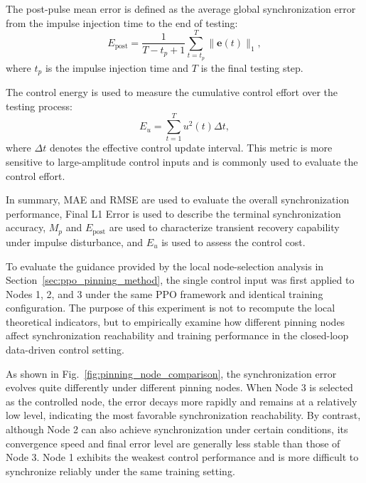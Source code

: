 \documentclass[10pt,twocolumn]{article}
\theoremstyle{definition}
\begin{document}
The post-pulse mean error is defined as the average global synchronization error from the impulse injection time to the end of testing:
\begin{equation}
	E_{\mathrm{post}}
	=
	\frac{1}{T-t_p+1}
	\sum_{t=t_p}^{T}
	\|\mathbf{e}(t)\|_1,
	\label{eq:post_pulse_mean_error}
\end{equation}
where $t_p$ is the impulse injection time and $T$ is the final testing step.

The control energy is used to measure the cumulative control effort over the testing process:
\begin{equation}
	E_u=
	\sum_{t=1}^{T}
	u^2(t)\Delta t,
	\label{eq:control_energy}
\end{equation}
where $\Delta t$ denotes the effective control update interval. This metric is more sensitive to large-amplitude control inputs and is commonly used to evaluate the control effort.

In summary, MAE and RMSE are used to evaluate the overall synchronization performance, Final L1 Error is used to describe the terminal synchronization accuracy, $M_p$ and $E_{\mathrm{post}}$ are used to characterize transient recovery capability under impulse disturbance, and $E_u$ is used to assess the control cost.


To evaluate the guidance provided by the local node-selection analysis in Section~\ref{sec:ppo_pinning_method}, the single control input was first applied to Nodes 1, 2, and 3 under the same PPO framework and identical training configuration. The purpose of this experiment is not to recompute the local theoretical indicators, but to empirically examine how different pinning nodes affect synchronization reachability and training performance in the closed-loop data-driven control setting.

As shown in Fig.~\ref{fig:pinning_node_comparison}, the synchronization error evolves quite differently under different pinning nodes. When Node 3 is selected as the controlled node, the error decays more rapidly and remains at a relatively low level, indicating the most favorable synchronization reachability. By contrast, although Node 2 can also achieve synchronization under certain conditions, its convergence speed and final error level are generally less stable than those of Node 3. Node 1 exhibits the weakest control performance and is more difficult to synchronize reliably under the same training setting.
\end{document}
